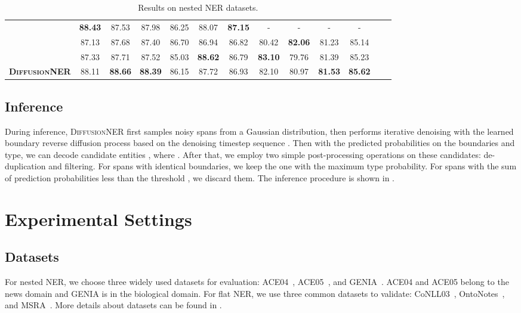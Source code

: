 \documentclass[11pt]{article}
\begin{document}
\begin{table*}[]
\begin{tabular}{lcccccccccccc}
  \citet{zhu-li-2022-boundary} & \textbf{88.43} & 87.53 &  87.98 & 86.25 &  88.07 &  \textbf{87.15} &  - &  - &  - & -\\
  \citet{yuan-etal-2022-fusing} & 87.13 &  87.68 &  87.40 &  86.70 &  86.94 &  86.82 & 80.42 & \textbf{82.06} & 81.23 & {85.14} \\
  \citet{li2022unified} & 87.33 &  87.71 &  87.52 & 85.03 & \textbf{88.62} &  86.79 & \textbf{83.10} & 79.76 & {81.39} & {85.23} \\
\midrule
\textbf{\textsc{DiffusionNER}} & 88.11 & \textbf{88.66} & \textbf{88.39} &  86.15 & 87.72 & 86.93 & 82.10 & 80.97 & \textbf{81.53} &\textbf{85.62}\\
\bottomrule
\end{tabular}
\caption{Results on {nested} NER datasets.}
\label{tab:nested}
\end{table*}




\subsection{Inference}
\label{sec:3.4}

During inference, \textsc{DiffusionNER} first samples  noisy spans from a Gaussian distribution, then performs iterative denoising with the learned boundary reverse diffusion process based on the denoising timestep sequence .
Then with the predicted probabilities on the boundaries and type, we can decode  candidate entities , where .
After that, we employ two simple post-processing operations on these candidates: de-duplication and filtering. For spans with identical boundaries, we keep the one with the maximum type probability. For spans with the sum of prediction probabilities less than the threshold , we discard them. The inference procedure is shown in .


\section{Experimental Settings}

\subsection{Datasets}

For nested NER, we choose three widely used datasets for evaluation: ACE04~\citep{ doddington-etal-2004-automatic}, ACE05~\citep{2005-automatic}, and GENIA~\citep{10.5555/1289189.1289260}. ACE04 and ACE05 belong to the news domain and GENIA is in the biological domain. For flat NER, we use three common datasets to validate: CoNLL03~\citep{tjong-kim-sang-de-meulder-2003-introduction}, OntoNotes~\citep{pradhan-etal-2013-towards}, and MSRA~\citep{levow-2006-third}. More details about datasets can be found in .
\end{document}
